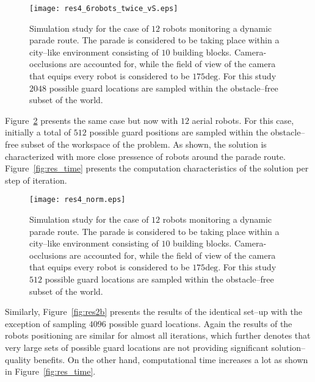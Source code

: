 \documentclass[letterpaper, 10 pt, conference]{ieeeconf}  %
\begin{document}
%
\begin{figure}[htbp]
\centering
  \texttt{[image: res4\_6robots\_twice\_vS.eps]}
\caption{Simulation study for the case of $12$ robots monitoring a dynamic parade route. The parade is considered to be taking place within a city--like environment consisting of $10$ building blocks. Camera-occlusions are accounted for, while the field of view of the camera that equips every robot is considered to be $175\textrm{deg}$. For this study $2048$ possible guard locations are sampled within the obstacle--free subset of the world. }
\label{fig:res1b}
\end{figure}
%

Figure~\ref{fig:res2} presents the same case but now with $12$ aerial robots. For this case, initially a total of $512$ possible guard positions are sampled within the obstacle--free subset of the workspace of the problem. As shown, the solution is characterized with more close pressence of robots around the parade route. Figure~\ref{fig:res_time} presents the computation characteristics of the solution per step of iteration.

%
\begin{figure}[htbp]
\centering
  \texttt{[image: res4\_norm.eps]}
\caption{Simulation study for the case of $12$ robots monitoring a dynamic parade route. The parade is considered to be taking place within a city--like environment consisting of $10$ building blocks. Camera-occlusions are accounted for, while the field of view of the camera that equips every robot is considered to be $175\textrm{deg}$. For this study $512$ possible guard locations are sampled within the obstacle--free subset of the world.}
\label{fig:res2}
\end{figure}
%

Similarly, Figure~\ref{fig:res2b} presents the results of the identical set--up with the exception of sampling $4096$ possible guard locations. Again the results of the robots positioning are similar for almost all iterations, which further denotes that very large sets of possible guard locations are not providing significant solution--quality benefits. On the other hand, computational time increases a lot as shown in Figure~\ref{fig:res_time}.
\end{document}
